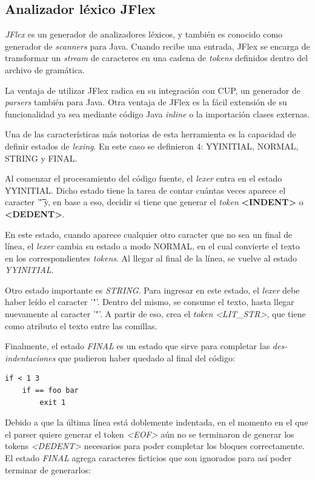 \documentclass[spanish]{article}
\begin{document}
        \subsection{Analizador léxico JFlex}
             \textit{JFlex} \cite{flex_home} es un generador de analizadores léxicos, y también es conocido como generador de \textit{scanners} para Java. Cuando recibe una entrada, JFlex se encarga de transformar un \textit{stream} de caracteres en una cadena de \textit{tokens} definidos dentro del archivo de gramática.
            \par La ventaja de utilizar JFlex radica en su integración con CUP, un generador de \textit{parsers} también para Java. Otra ventaja de JFlex es la fácil extensión de su funcionalidad ya sea mediante código Java \textit{inline} o la importación clases externas.
            \\
            \par Una de las características más notorias de esta herramienta es la capacidad de definir estados de \textit{lexing}. En este caso se definieron 4: YYINITIAL, NORMAL, STRING y FINAL.
            \par Al comenzar el procesamiento del código fuente, el \textit{lexer} entra en el estado YYINITIAL. Dicho estado tiene la tarea de contar cuántas veces aparece el caracter '\t' y, en base a eso, decidir si tiene que generar el \textit{token} \textbf{<INDENT>} o \textbf{<DEDENT>}.
            \par En este estado, cuando aparece cualquier otro caracter que no sea un final de línea, el \textit{lexer} cambia su estado a modo NORMAL, en el cual convierte el texto en los correspondientes \textit{tokens}. Al llegar al final de la línea, se vuelve al estado \textit{YYINITIAL}.
            \par Otro estado importante es \textit{STRING}. Para ingresar en este estado, el \textit{lexer} debe haber leído el caracter '"'. Dentro del mismo, se consume el texto, hasta llegar nuevamente al caracter '"'. A partir de eso, crea el \textit{token} \textit{<LIT\_STR>}, que tiene como atributo el texto entre las comillas.
            \par Finalmente, el estado \textit{FINAL} es un estado que sirve para completar las \textit{des-indentaciones} que pudieron haber quedado al final del código:
            \begin{lstlisting}
if < 1 3
    if == foo bar
        exit 1
            \end{lstlisting}
            Debido a que la última línea está doblemente indentada, en el momento en el que el parser quiere generar el token \textit{<EOF>} aún no se terminaron de generar los tokens \textit{<DEDENT>} necesarios para poder completar los bloques correctamente. El estado \textit{FINAL} agrega caracteres ficticios que son ignorados para así poder terminar de generarlos:
\end{document}
